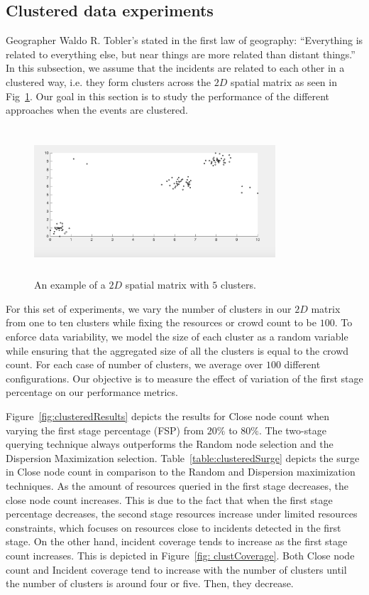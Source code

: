 \documentclass{acm_proc_article-sp}
\begin{document}
\subsection{Clustered data experiments}
Geographer Waldo R. Tobler's stated in the first law of geography: ``Everything is related to everything else, but near things are more related than distant things.'' In this subsection, we assume that the incidents are related to each other in a clustered way, i.e. they form clusters across the $2D$ spatial matrix as seen in Fig~\ref{fig: clust}. Our goal in this section is to study the performance of the different approaches when the events are clustered.\par
\begin{figure}[!h]
\centering
\includegraphics[width=9cm ,height=5.5cm]{figuresPng/clust.png}
\caption{An example of a $2D$ spatial matrix with $5$ clusters.}\label{fig: clust}
\end{figure}

For this set of experiments, we vary the number of clusters in our $2D$ matrix from one to ten clusters while fixing the resources or crowd count to be $100$. To enforce data variability, we model the size of each cluster as a random variable while ensuring that the aggregated size of all the clusters is equal to the crowd count. For each case of number of clusters, we average over $100$ different configurations. Our objective is to measure the effect of variation of the first stage percentage on our performance metrics.\par

Figure~\ref{fig:clusteredResults} depicts the results for Close node count when varying the first stage percentage (FSP) from $20\%$ to $80\%$. The two-stage querying technique always outperforms the Random node selection and the Dispersion Maximization selection. Table~\ref{table:clusteredSurge} depicts the surge in Close node count in comparison to the Random and Dispersion maximization techniques. As the amount of resources queried in the first stage decreases, the close node count increases. This is due to the fact that when the first stage percentage decreases, the second stage resources increase under limited resources constraints, which focuses on resources close to incidents detected in the first stage. On the other hand, incident coverage tends to increase as the first stage count increases. This is depicted in Figure~\ref{fig: clustCoverage}. Both Close node count and Incident coverage tend to increase with the number of clusters until the number of clusters is around four or five. Then, they decrease.
\end{document}
